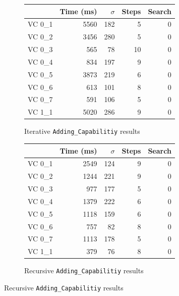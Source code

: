 \begin{figure}
	\centering
	\begin{subfigure}[b]{0.45\textwidth}
		\centering
		\begin{tabular}{lrrrr}
			\toprule
				& Time (ms)	& $\sigma$& Steps & Search \\
			\midrule
			VC 0\_1	& 5560		& 182	& 5	& 0     \\
			VC 0\_2	& 3456		& 280	& 5	& 0     \\
			VC 0\_3	& 565		& 78	& 10	& 0     \\
			VC 0\_4	& 834		& 197	& 9	& 0     \\
			VC 0\_5	& 3873		& 219	& 6	& 0     \\
			VC 0\_6	& 613		& 101	& 8	& 0     \\
			VC 0\_7	& 591		& 106	& 5	& 0     \\
			VC 1\_1	& 5020		& 286	& 9	& 0     \\
			\bottomrule
		\end{tabular}
		\caption{Iterative \texttt{Adding\_Capabilitiy} results\label{fig:iterAddResults}}
	\end{subfigure}
	\qquad
	\begin{subfigure}[b]{0.45\textwidth}
		\centering
		\begin{tabular}{lrrrr}
			\toprule
				& Time (ms)	& $\sigma$& Steps & Search \\
			\midrule
			VC 0\_1	& 2549		& 124	& 9	& 0     \\
			VC 0\_2	& 1244		& 221	& 9	& 0     \\
			VC 0\_3	& 977		& 177	& 5	& 0     \\
			VC 0\_4	& 1379		& 222	& 6	& 0     \\
			VC 0\_5	& 1118		& 159	& 6	& 0     \\
			VC 0\_6	& 757		& 82	& 8	& 0     \\
			VC 0\_7	& 1113		& 178	& 5	& 0     \\
			VC 1\_1	& 379		& 76	& 8	& 0     \\
			\bottomrule
		\end{tabular}
		\caption{Recursive \texttt{Adding\_Capabilitiy} results\label{fig:recAddResults}}
	\end{subfigure}


\end{figure}
